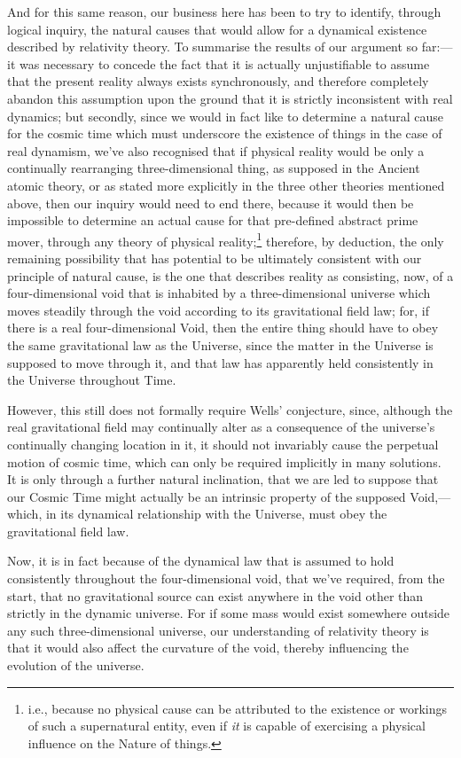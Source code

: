 And for this same reason, our business here has been to try to identify, through logical inquiry, the natural causes that would allow for a dynamical existence described by relativity theory. To summarise the results of our argument so far:---it was necessary to concede the fact that it is actually unjustifiable to assume that the present reality always exists synchronously, and therefore completely abandon this assumption upon the ground that it is strictly inconsistent with real dynamics; but secondly, since we would in fact like to determine a natural cause for the cosmic time which must underscore the existence of things in the case of real dynamism, we've also recognised that if physical reality would be only a continually rearranging three-dimensional thing, as supposed in the Ancient atomic theory, or as stated more explicitly in the three other theories mentioned above, then our inquiry would need to end there, because it would then be impossible to determine an actual cause for that pre-defined abstract prime mover, through any theory of physical reality;\footnote{i.e., because no physical cause can be attributed to the existence or workings of such a supernatural entity, even if \textit{it} is capable of exercising a physical influence on the Nature of things.} therefore, by deduction, the only remaining possibility that has potential to be ultimately consistent with our principle of natural cause, is the one that describes reality as consisting, now, of a four-dimensional void that is inhabited by a three-dimensional universe which moves steadily through the void according to its gravitational field law; for, if there is a real four-dimensional Void, then the entire thing should have to obey the same gravitational law as the Universe, since the matter in the Universe is supposed to move through it, and that law has apparently held consistently in the Universe throughout Time.

However, this still does not formally require Wells' conjecture, since, although the real gravitational field may continually alter as a consequence of the universe's continually changing location in it, it should not invariably cause the perpetual motion of cosmic time, which can only be required implicitly in many solutions. It is only through a further natural inclination, that we are led to suppose that our Cosmic Time might actually be an intrinsic property of the supposed Void,---which, in its dynamical relationship with the Universe, must obey the gravitational field law. 

Now, it is in fact because of the dynamical law that is assumed to hold consistently throughout the four-dimensional void, that we've required, from the start, that no gravitational source can exist anywhere in the void other than strictly in the dynamic universe. For if some mass would exist somewhere outside any such three-dimensional universe, our understanding of relativity theory is that it would also affect the curvature of the void, thereby influencing the evolution of the universe.

